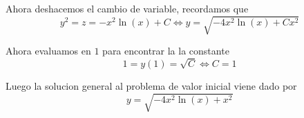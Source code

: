 \documentclass[a4paper,oneside,10.5pt]{article}
\begin{document}
\begin{sol}
  Ahora deshacemos el cambio de variable, recordamos que
  \begin{equation*}
    y^{2} = z = -x^{2} \ln(x) + C \iff y = \sqrt{-4x^{2} \ln(x) + Cx^{2}}
  \end{equation*}

  Ahora evaluamos en $1$ para encontrar la la constante
  \begin{equation*}
    1 = y(1) = \sqrt{C} \iff C = 1
  \end{equation*}

  Luego la solucion general al problema de valor inicial viene dado por
  \begin{equation*}
    y = \sqrt{-4x^{2}\ln(x) + x^{2}}
  \end{equation*}


\end{sol}
\end{document}

